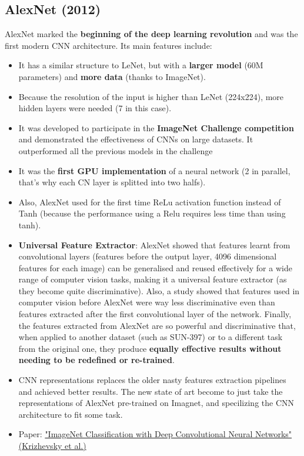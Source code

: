 \subsection{AlexNet (2012)}
AlexNet marked the \textbf{beginning of the deep learning revolution} and was the first modern CNN architecture. Its main features include:

\begin{itemize}
    \item It has a similar structure to LeNet, but with a \textbf{larger model} (60M parameters) and \textbf{more data} (thanks to ImageNet).
    \item Because the resolution of the input is higher than LeNet (224x224), more hidden layers were needed (7 in this case).
    \item It was developed to participate in the \textbf{ImageNet Challenge competition} and demonstrated the effectiveness of CNNs on large datasets. It outperformed all the previous models in the challenge
    \item It was the \textbf{first GPU implementation} of a neural network (2 in parallel, that's why each CN layer is splitted into two halfs).
    \item Also, AlexNet used for the first time ReLu activation function instead of Tanh (because the performance using a Relu requires less time than using tanh).
    \item \textbf{Universal Feature Extractor}: AlexNet showed that features learnt from convolutional layers (features before the output layer, 4096 dimensional features for each image) can be generalised and reused effectively for a wide range of computer vision tasks, making it a universal feature extractor (as they become quite discriminative). Also, a study showed that features used in computer vision before AlexNet were way less discriminative even than features extracted after the first convolutional layer of the network. Finally, the features extracted from AlexNet are so powerful and discriminative that, when applied to another dataset (such as SUN-397) or to a different task from the original one, they produce \textbf{equally effective results without needing to be redefined or re-trained}.
    \item CNN representations replaces the older nasty features extraction pipelines and achieved better results. The new state of art become to just take the representations of AlexNet pre-trained on Imagnet, and specilizing the CNN architecture to fit some task.
    \item Paper: \href{https://papers.nips.cc/paper/4824-imagenet-classification-with-deep-convolutional-neural-networks.pdf}{"ImageNet Classification with Deep Convolutional Neural Networks" (Krizhevsky et al.)}
\end{itemize}

